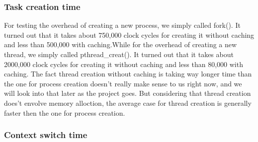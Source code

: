 \subsubsection{Task creation time}
For testing the overhead of creating a new process, we simply called fork(). It turned out that it takes about 750,000 clock cycles for creating it without caching and less than 500,000 with caching.While for the overhead of creating a new thread, we simply called pthread\_creat(). It turned out that it takes about 2000,000 clock cycles for creating it without caching and less than 80,000 with caching.
The fact thread creation without caching is taking way longer time than the one for process creation doesn't really make sense to us right now, and we will look into that later as the project goes. But considering that thread creation does't envolve memory alloction, the average case for thread creation is generally faster then the one for process creation.


\subsubsection{Context switch time}



